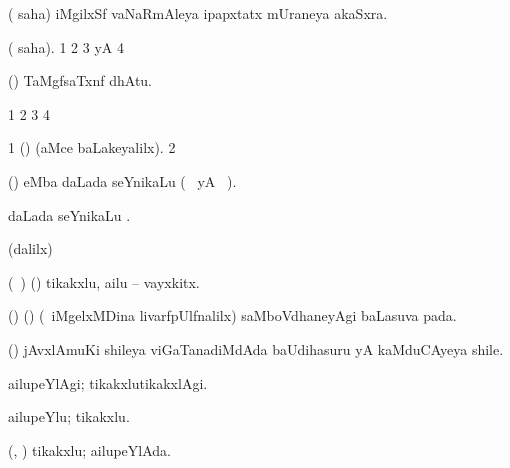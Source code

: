\bentry
{} 
\gl{\nA}
\bmng
( saha) iMgilxSf vaNaRmAleya ipapxtatx mUraneya akaSxra. 
\emng
\eentry

\bentry
{}
\gl{\saMkiSx}
\expl{}
\bmng
( saha). 
\bnum
\num{1}  
\num{2}  
\num{3}  yA  
\num{4}  
\enum
\emng
\eentry

\bentry
{}
\pron{}
\gl{\saMkeV}
\expl{}
\bmng
(\ravi) TaMgfsaTxnf dhAtu. 
\emng
\eentry

\bentry
{}
\gl{\saMkiSx}
\expl{}
\bmng
\bnum
\num{1}  
\num{2}  
\num{3}  
\num{4}  
\enum
\emng
\eentry


\bentry
{}
\gl{\saMkiSx}
\expl{}
\bmng
\bnum
\num{1} (\ame)  (aMce baLakeyalilx). 
\num{2}  
\enum
\emng
\eentry


\bentry
{} 
\gl{\nA}
\expl{}
\bmng
(\ca)  eMba daLada seYnikaLu (\birx\  yA \ame\ ). 
\emng
\eentry


\bentry
{} 
\gl{\nA}
\expl{}
\bmng
{} daLada seYnikaLu . 
\emng
\eentry

\bentry
{}
\gl{\saMkiSx}
\expl{}
\bmng
(\ame dalilx)  
\emng
\eentry

\bentry
{} 
\gl{\nA}
\expl{}
\bmng
(\kanmu\ \ame) (\ashi) tikakxlu, ailu -- vayxkitx. 
\emng
\eentry

\bentry
{} 
\gl{\nA}
\expl{}
\bmng
(\birx) (\pArxM) (\kanmu\ iMgelxMDina livarfpUlfnalilx) saMboVdhaneyAgi baLasuva pada. 
\emng
\eentry

\bentry
{} 
\gl{\nA}
\expl{}
\bmng
(\ca) jAvxlAmuKi shileya viGaTanadiMdAda baUdihasuru yA kaMduCAyeya shile. 
\emng
\eentry

\bentry
{} 
\gl{\kirxvi}
\expl{}
\bmng
ailupeYlAgi; tikakxlutikakxlAgi. 
\emng
\eentry

\bentry
{} 
\gl{\nA}
\expl{}
\bmng
ailupeYlu; tikakxlu. 
\emng
\eentry

\bentry
{} 
\gl{\gu}
\expl{}
\bmng
(\ame, \ashi) tikakxlu; ailupeYlAda. 
\emng
\eentry

